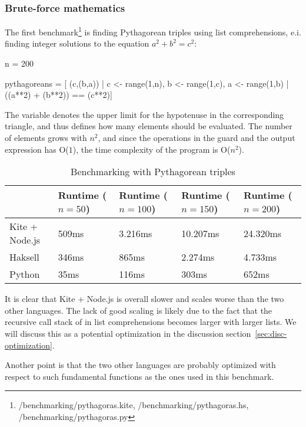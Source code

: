 \subsubsection{Brute-force mathematics}
\label{sec:math-benchmark}
The first benchmark\footnote{/benchmarking/pythagoras.kite, /benchmarking/pythagoras.hs, /benchmarking/pythagoras.py} is finding Pythagorean triples using list comprehensions, e.i. finding integer solutions to the equation $a^2 + b^2 = c^2$:

\begin{kite}
  n = 200

  pythagoreans = [ (c,(b,a)) | c <- range(1,n), b <- range(1,c),
        a <- range(1,b) | ((a**2) + (b**2)) == (c**2)]
\end{kite}

The variable  denotes the upper limit for the hypotenuse in the corresponding triangle, and thus defines how many elements should be evaluated. The number of elements grows with $n^2$, and since the operations in the guard and the output expression has O($1$), the time complexity of the program is O($n^2$).

\begin{table}[h]
  \centering
  \begin{tabular}{|l|l|l|l|l|}
    \hline
                   & Runtime ($n = 50$) & Runtime ($n = 100$) & Runtime ($n = 150$) & Runtime ($n = 200$) \\
    \hline
    Kite + Node.js & 509ms              & 3.216ms             & 10.207ms            & 24.320ms            \\
    Haksell        & 346ms              & 865ms               & 2.274ms             & 4.733ms             \\
    Python         & 35ms               & 116ms               & 303ms               & 652ms               \\
    \hline
  \end{tabular}
  \caption{Benchmarking with Pythagorean triples}
\end{table}

It is clear that Kite + Node.js is overall slower and scales worse than the two other languages. The lack of good scaling is likely due to the fact that the recursive call stack of  in list comprehensions becomes larger with larger lists. We will discuss this as a potential optimization in the discussion section~\ref{sec:disc-optimization}.

Another point is that the two other languages are probably optimized with respect to such fundamental functions as the ones used in this benchmark.

